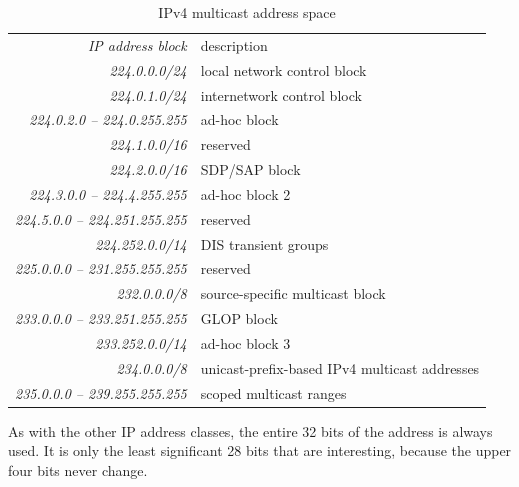 \begin{table}
   \centering
   \begin{tabular}{rl}
   \textit{            IP address block} & description                     \\[1ex]
   \textit{                224.0.0.0/24} & local network control block     \\
   \textit{                224.0.1.0/24} & internetwork control block      \\
   \textit{  224.0.2.0 -- 224.0.255.255} & ad-hoc block                    \\
   \textit{                224.1.0.0/16} & reserved                        \\
   \textit{                224.2.0.0/16} & SDP/SAP block                   \\
   \textit{  224.3.0.0 -- 224.4.255.255} & ad-hoc block 2                  \\
   \textit{224.5.0.0 -- 224.251.255.255} & reserved                        \\
   \textit{              224.252.0.0/14} & DIS transient groups            \\
   \textit{225.0.0.0 -- 231.255.255.255} & reserved                        \\
   \textit{                 232.0.0.0/8} & source-specific multicast block \\
   \textit{233.0.0.0 -- 233.251.255.255} & GLOP block                      \\
   \textit{              233.252.0.0/14} & ad-hoc block 3                  \\
   \textit{                 234.0.0.0/8} & unicast-prefix-based IPv4 multicast addresses \\
   \textit{235.0.0.0 -- 239.255.255.255} & scoped multicast ranges         \\
   \end{tabular}
   \caption{IPv4 multicast address space}
   \label{tab:ipv4-multicast-address-space}
\end{table}


\begin{note}
As with the other IP address classes, the entire 32 bits of the address is always used.
It is only the least significant 28 bits that are interesting, because the upper four bits never change.
\end{note}

